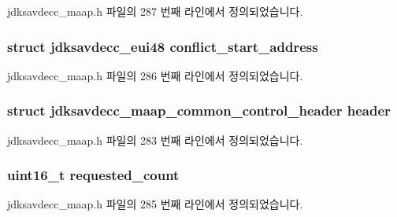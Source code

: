 jdksavdecc\+\_\+maap.\+h 파일의 287 번째 라인에서 정의되었습니다.

\subsubsection[{\texorpdfstring{conflict\+\_\+start\+\_\+address}{conflict_start_address}}]{\setlength{\rightskip}{0pt plus 5cm}struct {\bf jdksavdecc\+\_\+eui48} conflict\+\_\+start\+\_\+address}\hypertarget{structjdksavdecc__maap_a8e207eea768f9c09349717e706b65a3b}{}\label{structjdksavdecc__maap_a8e207eea768f9c09349717e706b65a3b}


jdksavdecc\+\_\+maap.\+h 파일의 286 번째 라인에서 정의되었습니다.

\subsubsection[{\texorpdfstring{header}{header}}]{\setlength{\rightskip}{0pt plus 5cm}struct {\bf jdksavdecc\+\_\+maap\+\_\+common\+\_\+control\+\_\+header} header}\hypertarget{structjdksavdecc__maap_a14c416d0f59ebb809de1ab5889e4cd06}{}\label{structjdksavdecc__maap_a14c416d0f59ebb809de1ab5889e4cd06}


jdksavdecc\+\_\+maap.\+h 파일의 283 번째 라인에서 정의되었습니다.

\subsubsection[{\texorpdfstring{requested\+\_\+count}{requested_count}}]{\setlength{\rightskip}{0pt plus 5cm}uint16\+\_\+t requested\+\_\+count}\hypertarget{structjdksavdecc__maap_a3b7ca808f59412368434591249aa8a79}{}\label{structjdksavdecc__maap_a3b7ca808f59412368434591249aa8a79}


jdksavdecc\+\_\+maap.\+h 파일의 285 번째 라인에서 정의되었습니다.

